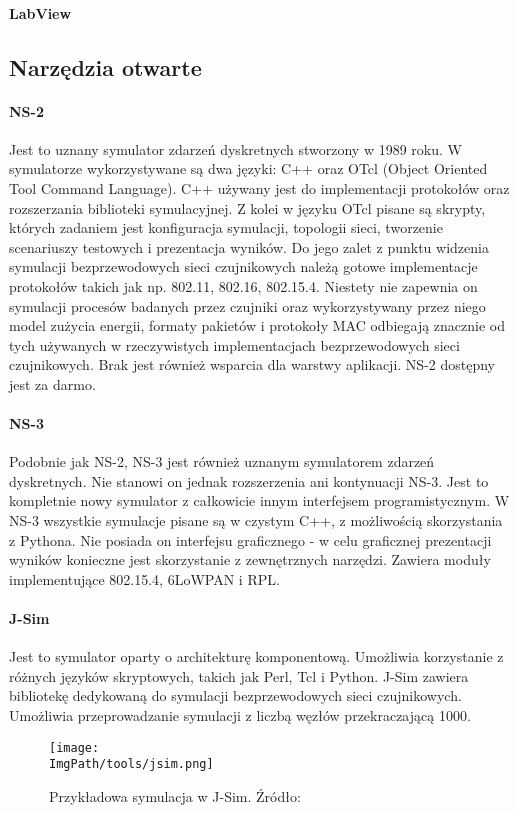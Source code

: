 \paragraph{LabView}
\subsection{Narzędzia otwarte}
\paragraph{NS-2} Jest to uznany symulator zdarzeń dyskretnych stworzony w 1989 roku. W symulatorze wykorzystywane są dwa języki: C++ oraz OTcl (Object Oriented Tool Command Language). C++ używany jest do implementacji protokołów oraz rozszerzania biblioteki symulacyjnej. Z kolei w języku OTcl pisane są skrypty, których zadaniem jest konfiguracja symulacji, topologii sieci, tworzenie scenariuszy testowych i prezentacja wyników. Do jego zalet z punktu widzenia symulacji bezprzewodowych sieci czujnikowych należą gotowe implementacje protokołów takich jak np. 802.11, 802.16, 802.15.4. Niestety nie zapewnia on symulacji  procesów badanych przez czujniki oraz wykorzystywany przez niego model zużycia energii, formaty pakietów i protokoły MAC odbiegają znacznie od tych używanych w rzeczywistych implementacjach bezprzewodowych sieci czujnikowych. Brak jest również wsparcia dla warstwy aplikacji. NS-2 dostępny jest za darmo.
\paragraph{NS-3}
Podobnie jak NS-2, NS-3 jest również uznanym symulatorem zdarzeń dyskretnych. Nie stanowi on jednak rozszerzenia ani kontynuacji NS-3. Jest to kompletnie nowy symulator z całkowicie innym interfejsem programistycznym. W NS-3 wszystkie symulacje pisane są w czystym C++, z możliwością skorzystania z Pythona. Nie posiada on interfejsu graficznego - w celu graficznej prezentacji wyników konieczne jest skorzystanie z zewnętrznych narzędzi. Zawiera moduły implementujące 802.15.4, 6LoWPAN i RPL.
\paragraph{J-Sim}
Jest to symulator oparty o architekturę komponentową. Umożliwia korzystanie z różnych języków skryptowych, takich jak Perl, Tcl i Python. J-Sim zawiera bibliotekę dedykowaną do symulacji bezprzewodowych sieci czujnikowych. Umożliwia przeprowadzanie symulacji z liczbą węzłów przekraczającą 1000.
\begin{figure}[H]
	\begin{center}
		\centering
		\texttt{[image: \\ImgPath/tools/jsim.png]} 
	\end{center}
	\caption{Przykładowa symulacja w J-Sim. Źródło: \cite{KarkazisP.2012RmiJ}}
	\label{jsim}
\end{figure}
